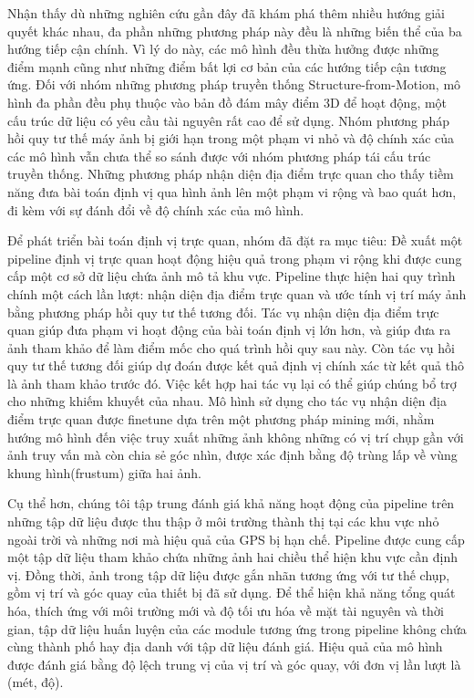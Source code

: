 Nhận thấy dù những nghiên cứu gần đây đã khám phá thêm nhiều hướng giải quyết khác nhau, đa phần những phương pháp này đều là những biến thể của ba hướng tiếp cận chính. Vì lý do này, các mô hình đều thừa hưởng được những điểm mạnh cũng như những điểm bất lợi cơ bản của các hướng tiếp cận tương ứng. Đối với nhóm những phương pháp truyền thống Structure-from-Motion, mô hình đa phần đều phụ thuộc vào bản đồ đám mây điểm 3D để hoạt động, một cấu trúc dữ liệu có yêu cầu tài nguyên rất cao để sử dụng. Nhóm phương pháp hồi quy tư thế máy ảnh bị giới hạn trong một phạm vi nhỏ và độ chính xác của các mô hình vẫn chưa thể so sánh được với nhóm phương pháp tái cấu trúc truyền thống. Những phương pháp nhận diện địa điểm trực quan cho thấy tiềm năng đưa bài toán định vị qua hình ảnh lên một phạm vi rộng và bao quát hơn, đi kèm với sự đánh đổi về độ chính xác của mô hình.

Để phát triển bài toán định vị trực quan, nhóm đã đặt ra mục tiêu: Đề xuất một pipeline định vị trực quan hoạt động hiệu quả trong phạm vi rộng khi được cung cấp một cơ sở dữ liệu chứa ảnh mô tả khu vực. Pipeline thực hiện hai quy trình chính một cách lần lượt: nhận diện địa điểm trực quan và ước tính vị trí máy ảnh bằng phương pháp hồi quy tư thế tương đối. Tác vụ nhận diện địa điểm trực quan giúp đưa phạm vi hoạt động của bài toán định vị lớn hơn, và giúp đưa ra ảnh tham khảo để làm điểm mốc cho quá trình hồi quy sau này. Còn tác vụ hồi quy tư thế tương đối giúp dự đoán được kết quả định vị chính xác từ kết quả thô là ảnh tham khảo trước đó. Việc kết hợp hai tác vụ lại có thể giúp chúng bổ trợ cho những khiếm khuyết của nhau. Mô hình sử dụng cho tác vụ nhận diện địa điểm trực quan được finetune dựa trên một phương pháp mining mới, nhằm hướng mô hình đến việc truy xuất những ảnh không những có vị trí chụp gần với ảnh truy vấn mà còn chia sẻ góc nhìn, được xác định bằng độ trùng lấp về vùng khung hình(frustum) giữa hai ảnh.

Cụ thể hơn, chúng tôi tập trung đánh giá khả năng hoạt động của pipeline trên những tập dữ liệu được thu thập ở môi trường thành thị tại các khu vực nhỏ ngoài trời và những nơi mà hiệu quả của GPS bị hạn chế. Pipeline được cung cấp một tập dữ liệu tham khảo chứa những ảnh hai chiều thể hiện khu vực cần định vị. Đồng thời, ảnh trong tập dữ liệu được gắn nhãn tương ứng với tư thế chụp, gồm vị trí và góc quay của thiết bị đã sử dụng. Để thể hiện khả năng tổng quát hóa, thích ứng với môi trường mới và độ tối ưu hóa về mặt tài nguyên và thời gian, tập dữ liệu huấn luyện của các module tương ứng trong pipeline không chứa cùng thành phố hay địa danh với tập dữ liệu đánh giá. Hiệu quả của mô hình được đánh giá bằng độ lệch trung vị của vị trí và góc quay, với đơn vị lần lượt là (mét, độ).

